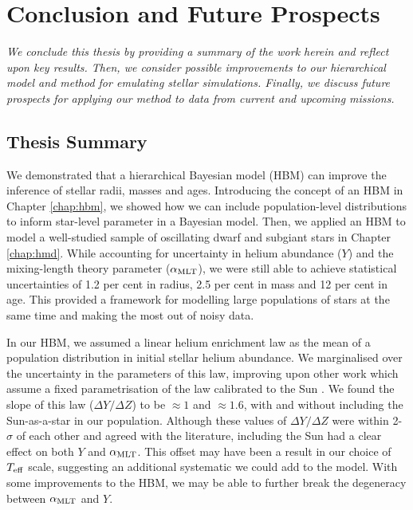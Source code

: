 %
%
%
%
%
\chapter{Conclusion and Future Prospects}

\textit{We conclude this thesis by providing a summary of the work herein and reflect upon key results. Then, we consider possible improvements to our hierarchical model and method for emulating stellar simulations. Finally, we discuss future prospects for applying our method to data from current and upcoming missions.}

\section{Thesis Summary}

We demonstrated that a hierarchical Bayesian model (HBM) can improve the inference of stellar radii, masses and ages. Introducing the concept of an HBM in Chapter \ref{chap:hbm}, we showed how we can include population-level distributions to inform star-level parameter in a Bayesian model. Then, we applied an HBM to model a well-studied sample of oscillating dwarf and subgiant stars in Chapter \ref{chap:hmd}. While accounting for uncertainty in helium abundance (\(Y\)) and the mixing-length theory parameter (\({\alpha_\mathrm{MLT}}\)), we were still able to achieve statistical uncertainties of 1.2 per cent in radius, 2.5 per cent in mass and 12 per cent in age. This provided a framework for modelling large populations of stars at the same time and making the most out of noisy data.

In our HBM, we assumed a linear helium enrichment law as the mean of a population distribution in initial stellar helium abundance. We marginalised over the uncertainty in the parameters of this law, improving upon other work which assume a fixed parametrisation of the law calibrated to the Sun \citep[e.g.][]{Serenelli.Johnson.ea2017}. We found the slope of this law (\(\Delta Y/\Delta Z\)) to be \(\approx 1\) and \(\approx 1.6\), with and without including the Sun-as-a-star in our population. Although these values of \(\Delta Y/\Delta Z\) were within 2-\(\sigma\) of each other and agreed with the literature, including the Sun had a clear effect on both \(Y\) and \({\alpha_\mathrm{MLT}}\). This offset may have been a result in our choice of \({T_\mathrm{eff}}\) scale, suggesting an additional systematic we could add to the model. With some improvements to the HBM, we may be able to further break the degeneracy between \({\alpha_\mathrm{MLT}}\) and \(Y\).

